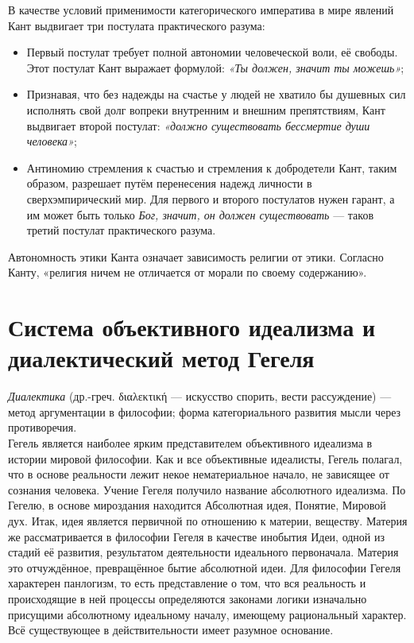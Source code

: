 \documentclass[12pt]{article}
\begin{document}
В качестве условий применимости категорического императива в мире явлений Кант выдвигает три постулата
практического разума:
\begin{itemize}
\item Первый постулат требует полной автономии человеческой воли, её свободы.
	Этот постулат Кант выражает формулой: \textit{«Ты должен, значит ты можешь»};
\item Признавая, что без надежды на счастье у людей не хватило бы душевных сил исполнять свой долг
	вопреки внутренним и внешним препятствиям, Кант выдвигает второй постулат:
	\textit{«должно существовать бессмертие души человека»};
\item Антиномию стремления к счастью и стремления к добродетели Кант,
	таким образом, разрешает путём перенесения надежд личности в сверхэмпирический мир.
	Для первого и второго постулатов нужен гарант, а им может быть только \textit{Бог, значит,
	он должен существовать} — таков третий постулат практического разума.
\end{itemize}
Автономность этики Канта означает зависимость религии от этики.
Согласно Канту, «религия ничем не отличается от морали по своему содержанию».


\newpage
\section{Система объективного идеализма и диалектический метод Гегеля}
\textit{Диалектика} (др.-греч. διαλεκτική — искусство спорить, вести рассуждение) --- метод аргументации в философии;
форма категориального развития мысли через противоречия. \\
Гегель является наиболее ярким представителем объективного идеализма в истории мировой философии. Как и все объективные идеалисты, Гегель полагал, что в основе реальности лежит некое нематериальное начало, не зависящее от сознания человека. Учение Гегеля получило название абсолютного идеализма. По Гегелю, в основе мироздания находится Абсолютная идея, Понятие, Мировой дух.
Итак, идея является первичной по отношению к материи, веществу. Материя же рассматривается в философии Гегеля в качестве инобытия Идеи, одной из стадий её развития, результатом деятельности идеального первоначала. Материя это отчуждённое, превращённое бытие абсолютной идеи. Для философии Гегеля характерен панлогизм, то есть представление о том, что вся реальность и происходящие в ней процессы определяются законами логики изначально присущими абсолютному идеальному началу, имеющему рациональный характер. Всё существующее в действительности имеет разумное основание.
\end{document}
